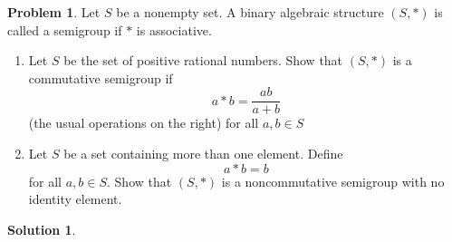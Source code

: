 \documentclass[10pt]{article}
\theoremstyle{definition}
\newtheorem{problem}{Problem}
\newtheorem{soln}{Solution}
\begin{document}
\begin{problem}
Let $S$ be a nonempty set. A binary algebraic structure $(S, *)$ is called
a semigroup if $*$ is associative.
\begin{enumerate}[label=(\alph*)]
  \item Let $S$ be the set of positive rational numbers. Show that $(S, *)$
        is a commutative semigroup if
        $$a*b=\frac{ab}{a+b}$$
        (the usual operations on the right) for all $a,b\in S$
  \item Let $S$ be a set containing more than one element. Define
        $$a*b=b$$
        for all $a,b\in S$. Show that $(S,*)$ is a noncommutative semigroup with no identity element.
\end{enumerate}
\end{problem}
\begin{soln}
\end{soln}
\end{document}
